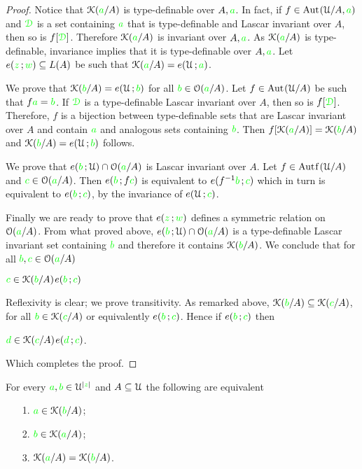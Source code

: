 \documentclass[creche.tex]{subfiles}
\begin{document}
\begin{proof}
  Notice that $\EuScript K({\color{green} a}/A)$ is type-definable over $A,{\color{green} a}$. In fact, if $f\in{\rm Aut\kern.15ex}(\EuScript U/A,{\color{green} a})$ and ${\color{green}\EuScript D}$ is a set containing ${\color{green} a}$ that is type-definable and Lascar invariant over $A$, then so is $f[{\color{green}\EuScript D}]$.  Therefore $\EuScript K({\color{green} a}/A)$ is invariant over $A,{\color{green} a}$. As $\EuScript K({\color{green} a}/A)$ is type-definable, invariance implies that it is type-definable over $A,{\color{green} a}$. Let $e({\color{green} z}\,;{\color{green} w})\subseteq L(A)$ be such that $\EuScript K({\color{green} a}/A)=e(\EuScript U\,;{\color{green} a})$. 
  
  We prove that $\EuScript K({\color{green} b}/A)=e(\EuScript U\,;{\color{green} b})$ for all ${\color{green} b}\in\EuScript O({\color{green} a}/A)$. Let $f\in{\rm Aut\kern.15ex}(\EuScript U/A)$ be such that $f{\color{green} a}={\color{green} b}$. If ${\color{green}\EuScript D}$ is a type-definable Lascar invariant over $A$, then so is $f[{\color{green}\EuScript D}]$. Therefore, $f$ is a bijection between type-definable sets that are Lascar invariant over $A$ and contain ${\color{green} a}$ and analogous sets containing ${\color{green} b}$. Then $f[\EuScript K({\color{green} a}/A)]=\EuScript K({\color{green} b}/A)$ and $\EuScript K({\color{green} b}/A)=e(\EuScript U\,;{\color{green} b})$ follows.
  
  We prove that $e({\color{green} b}\,;\EuScript U)\cap \EuScript O({\color{green} a}/A)$ is Lascar invariant over $A$. Let $f\in\mathord{\rm Aut\kern.15ex{f}\kern.15ex}(\EuScript U/A)$ and ${\color{green} c}\in\EuScript O({\color{green} a}/A)$. Then $e({\color{green} b}\,;f{\color{green} c})$ is equivalent to  $e(f^{-1}{\color{green} b}\,;{\color{green} c})$ which in turn is equivalent to $e({\color{green} b}\,;{\color{green} c})$, by the invariance of $e(\EuScript U\,;{\color{green} c})$. 
  
  Finally we are ready to prove that $e({\color{green} z}\,;{\color{green} w})$ defines a symmetric relation on $\EuScript O({\color{green} a}/A)$. From what proved above, $e({\color{green} b}\,;\EuScript U)\cap \EuScript O({\color{green} a}/A)$ is a type-definable Lascar invariant set containing ${\color{green} b}$ and therefore it contains $\EuScript K({\color{green} b}/A)$. We conclude that for all ${\color{green} b},{\color{green} c}\in\EuScript O({\color{green} a}/A)$
  
  \medrel{\iff}${\color{green} c}\in\EuScript K({\color{green} b}/A)$\medrel{\imp}$e({\color{green} b}\,;{\color{green} c})$
  
  Reflexivity is clear; we prove transitivity. As remarked above, $\EuScript K({\color{green} b}/A)\subseteq\EuScript K({\color{green} c}/A)$, for all ${\color{green} b}\in\EuScript K({\color{green} c}/A)$ or equivalently $e({\color{green} b}\,;{\color{green} c})$. Hence if $e({\color{green} b}\,;{\color{green} c})$ then
  
  \medrel{\iff}${\color{green} d}\in\EuScript K({\color{green} c}/A)$\medrel{\imp}$e({\color{green} d}\,;{\color{green} c})$.
  
  Which completes the proof.
\end{proof}

\begin{corollary}\label{corol_KP_simmetry}
For every ${\color{green} a},{\color{green} b}\in\EuScript U^{|{\color{green} z}|}$ and $A\subseteq\EuScript U$ the following are equivalent
\begin{itemize}
\item[1.] ${\color{green} a}\in\EuScript K({\color{green} b}/A)$;
\item[2.] ${\color{green} b}\in\EuScript K({\color{green} a}/A)$;
\item[3.] $\EuScript K({\color{green} a}/A)=\EuScript K({\color{green} b}/A)$.\QED
\end{itemize}
\end{corollary}
\end{document}
